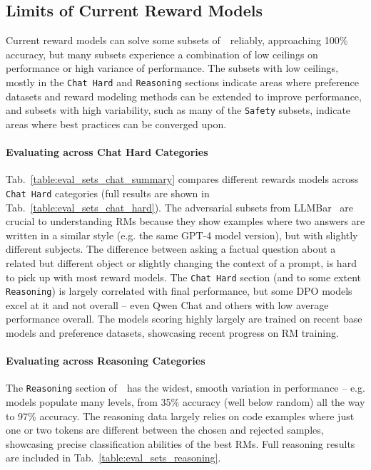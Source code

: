 

\subsection{Limits of Current Reward Models} \label{sec:limit1}
Current reward models can solve some subsets of~\name~reliably, approaching 100\% accuracy, but many subsets experience a combination of low ceilings on performance or high variance of performance. 
The subsets with low ceilings, mostly in the \texttt{Chat Hard} and \texttt{Reasoning} sections indicate areas where preference datasets and reward modeling methods can be extended to improve performance, and subsets with high variability, such as many of the \texttt{Safety} subsets, indicate areas where best practices can be converged upon.

\paragraph{Evaluating across Chat Hard Categories} Tab.~\ref{table:eval_sets_chat_summary} compares different rewards models across  \texttt{Chat Hard} categories (full results are shown in Tab.~\ref{table:eval_sets_chat_hard}). 
The adversarial subsets from LLMBar~\citep{zeng2023llmbar} are crucial to understanding RMs because they show examples where two answers are written in a similar style (e.g. the same GPT-4 model version), but with slightly different subjects.
The difference between asking a factual question about a related but different object or slightly changing the context of a prompt, is hard to pick up with most reward models.
The \texttt{Chat Hard} section (and to some extent \texttt{Reasoning}) is largely correlated with final performance, but some DPO models excel at it and not overall  -- even Qwen Chat and others with low average performance overall.
The models scoring highly largely are trained on recent base models and preference datasets, showcasing recent progress on RM training.


\paragraph{Evaluating across  Reasoning Categories} The \texttt{Reasoning} section of~\name~has the widest, smooth variation in performance -- e.g. models populate many levels, from 35\% accuracy (well below random) all the way to 97\% accuracy.
The reasoning data largely relies on code examples where just one or two tokens are different between the chosen and rejected samples, showcasing precise classification abilities of the best RMs.
Full reasoning results are included in Tab.~\ref{table:eval_sets_reasoning}.


